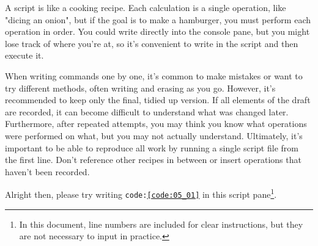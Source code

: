 \documentclass{ltjsbook}
\begin{document}
A script is like a cooking recipe. Each calculation is a single operation, like "dicing an onion", but if the goal is to make a hamburger, you must perform each operation in order. You could write directly into the console pane, but you might lose track of where you're at, so it's convenient to write in the script and then execute it.

When writing commands one by one, it's common to make mistakes or want to try different methods, often writing and erasing as you go. However, it's recommended to keep only the final, tidied up version. If all elements of the draft are recorded, it can become difficult to understand what was changed later. Furthermore, after repeated attempts, you may think you know what operations were performed on what, but you may not actually understand. Ultimately, it's important to be able to reproduce all work by running a single script file from the first line. Don't reference other recipes in between or insert operations that haven't been recorded.

Alright then, please try writing \texttt{code:\ref{code:05_01}} in this script pane\footnote{In this document, line numbers are included for clear instructions, but they are not necessary to input in practice.}.


\end{document}
